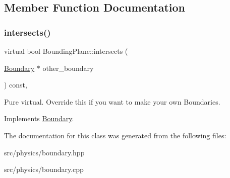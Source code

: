 \subsection{Member Function Documentation}
\mbox{\label{class_bounding_plane_a3d956121121f32384cab3cab34544d6e}} 
\subsubsection{\texorpdfstring{intersects()}{intersects()}}
{\footnotesize\ttfamily virtual bool Bounding\+Plane\+::intersects (\begin{DoxyParamCaption}\item[{\mbox{\hyperlink{class_boundary}{Boundary}} $\ast$}]{other\+\_\+boundary }\end{DoxyParamCaption}) const\hspace{0.3cm}{\ttfamily [override]}, {\ttfamily [virtual]}}

Pure virtual. Override this if you want to make your own Boundaries. 

Implements \mbox{\hyperlink{class_boundary_a364909bdfa4a4945f974c34a39e198cc}{Boundary}}.



The documentation for this class was generated from the following files\+:\begin{DoxyCompactItemize}
\item 
src/physics/boundary.\+hpp\item 
src/physics/boundary.\+cpp\end{DoxyCompactItemize}
